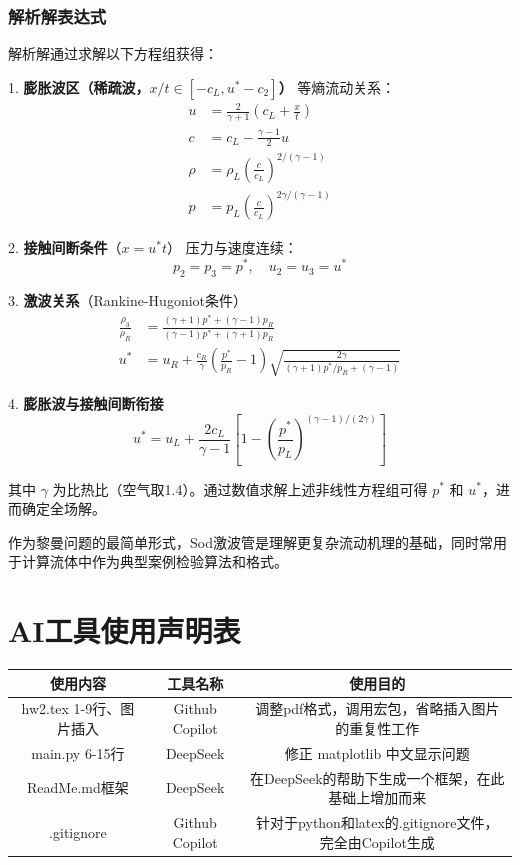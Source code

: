 \documentclass[UTF8]{ctexart}
\begin{document}
\subsubsection{解析解表达式}
解析解通过求解以下方程组获得：

1. \textbf{膨胀波区（稀疏波，$x/t \in [-c_L, u^*-c_2]$）}  
   等熵流动关系：
   \begin{align*}
   u &= \frac{2}{\gamma+1}\left(c_L + \frac{x}{t}\right) \\
   c &= c_L - \frac{\gamma-1}{2}u \\
   \rho &= \rho_L \left(\frac{c}{c_L}\right)^{2/(\gamma-1)} \\
   p &= p_L \left(\frac{c}{c_L}\right)^{2\gamma/(\gamma-1)}
   \end{align*}

2. \textbf{接触间断条件}（$x = u^* t$）  
   压力与速度连续：
   $$p_2 = p_3 = p^*, \quad u_2 = u_3 = u^*$$

3. \textbf{激波关系}（Rankine-Hugoniot条件）  
   \begin{align*}
   \frac{\rho_3}{\rho_R} &= \frac{(\gamma+1)p^* + (\gamma-1)p_R}{(\gamma-1)p^* + (\gamma+1)p_R} \\
   u^* &= u_R + \frac{c_R}{\gamma}\left(\frac{p^*}{p_R}-1\right)\sqrt{\frac{2\gamma}{(\gamma+1)p^*/p_R + (\gamma-1)}}
   \end{align*}

4. \textbf{膨胀波与接触间断衔接}  
   $$u^* = u_L + \frac{2c_L}{\gamma-1}\left[1 - \left(\frac{p^*}{p_L}\right)^{(\gamma-1)/(2\gamma)}\right]$$

其中 $\gamma$ 为比热比（空气取1.4）。通过数值求解上述非线性方程组可得 $p^*$ 和 $u^*$，进而确定全场解。

作为黎曼问题的最简单形式，Sod激波管是理解更复杂流动机理的基础，同时常用于计算流体中作为典型案例检验算法和格式。


\newpage
\appendix
\section{AI工具使用声明表}
\begin{table}[H]
    \centering
    \begin{tabular}{c|c|c}
        \hline
        使用内容 & 工具名称 & 使用目的 \\ \hline
        hw2.tex 1-9行、图片插入 & Github Copilot & 调整pdf格式，调用宏包，省略插入图片的重复性工作 \\ 
        main.py 6-15行 & DeepSeek & 修正 matplotlib 中文显示问题 \\ 
        ReadMe.md框架 & DeepSeek & 在DeepSeek的帮助下生成一个框架，在此基础上增加而来 \\
        .gitignore & Github Copilot & 针对于python和latex的.gitignore文件，完全由Copilot生成  
    \end{tabular}
    \label{tab:AI_tools}
\end{table}
\end{document}

